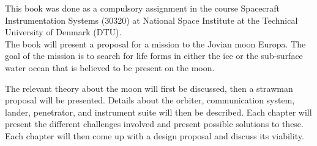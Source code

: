 
This book was done as a compulsory assignment in the course Spacecraft Instrumentation Systems (30320) at National Space Institute at the Technical University of Denmark (DTU).\\

\noindent
The book will present a proposal for a mission to the Jovian moon Europa. The goal of the mission is to search for life forms in either the ice or the sub-surface water ocean that is believed to be present on the moon.

The relevant theory about the moon will first be discussed, then a strawman proposal will be presented. Details about the orbiter, communication system, lander, penetrator, and instrument suite will then be described. Each chapter will present the different challenges involved and present possible solutions to these. Each chapter will then come up with a design proposal and discuss its viability.
